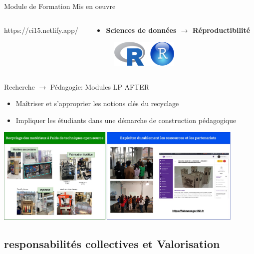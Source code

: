 \documentclass[
  11pt,
  ignorenonframetext,
  aspectratio=169,
  c]{beamer}
\providecommand{\tightlist}{%
  \setlength{\itemsep}{0pt}\setlength{\parskip}{0pt}}\usepackage{longtable,booktabs,array}
\begin{document}
\begin{frame}[t]{Module de Formation Mis en oeuvre}
\begin{columns}[T]
\begin{column}[T]{0.5\textwidth}
https://ci15.netlify.app/
\end{column}

\begin{column}[T]{0.5\textwidth}
\footnotesize

\begin{itemize}
\tightlist
\item
  \textbf{Sciences de données \(\rightarrow\) Réproductibilité}
\end{itemize}

\begin{figure}

{\centering \includegraphics[width=1.25in,height=\textheight]{figures/slides/Rlogo.png}

}

\end{figure}
\end{column}
\end{columns}
\end{frame}

\begin{frame}{Recherche \(\rightarrow\) Pédagogie: Modules LP AFTER}
\protect\hypertarget{recherche-rightarrow-puxe9dagogie-modules-lp-after}{}
\scriptsize

\begin{itemize}
\tightlist
\item
  Maîtriser et s'approprier les notions clés du recyclage
\item
  Impliquer les étudiants dans une démarche de construction pédagogique
\end{itemize}

\includegraphics[width=0.9\textwidth,height=\textheight]{figures/slides/Ensegnement-AFTER.jpg}

\normalsize
\end{frame}

\hypertarget{responsabilituxe9s-collectives-et-valorisation}{%
\subsection{responsabilités collectives et
Valorisation}\label{responsabilituxe9s-collectives-et-valorisation}}
\end{document}
